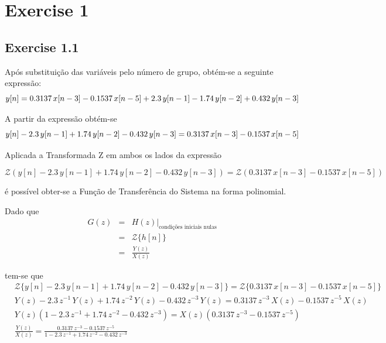 \documentclass[a4paper]{article}
\title{\documentTitle}
\author{\documentAuthors}
\begin{document}
\maketitle
\cleardoublepage

\tableofcontents
\cleardoublepage

\setlength{\parindent}{1cm}
\setlength{\parskip}{0.3cm}

\section{Exercise 1}
\subsection{Exercise 1.1}
\noindent Após substituição das variáveis pelo número de grupo, obtém-se a seguinte expressão:
\begin{equation}
	y[n] = 0.3137 \, x[n - 3] - 0.1537 \, x[n - 5] + 2.3 \, y[n - 1] - 1.74 \, y[n - 2] + 0.432 \, y[n - 3] \\
\end{equation}

\noindent A partir da expressão obtém-se
\begin{equation}
	y[n] - 2.3 \, y[n - 1] + 1.74 \, y[n - 2] - 0.432 \, y[n - 3] = 0.3137 \, x[n - 3] - 0.1537 \, x[n - 5] \\
\end{equation}

\noindent Aplicada a Transformada Z em ambos os lados da expressão

\begin{equation}
	\mathcal{Z}(y[n] - 2.3 \, y[n - 1] + 1.74 \, y[n - 2] - 0.432 \, y[n - 3]) = \mathcal{Z}(0.3137 \, x[n - 3] - 0.1537 \, x[n - 5])
\end{equation}

\noindent é possível obter-se a Função de Transferência do Sistema na forma polinomial.

\noindent Dado que
\begin{eqnarray}
	G(z) & = & H(z)|_{\text{condições iniciais nulas}} \\
		 & = & \mathcal{Z}\{h[n]\} \\
		 & = & \frac{Y(z)}{X(z)}
\end{eqnarray}

\noindent tem-se que
\begin{eqnarray}
	&\mathcal{Z}\{y[n] - 2.3 \, y[n - 1] + 1.74 \, y[n - 2] - 0.432 \, y[n - 3]\} = \mathcal{Z}\{0.3137 \, x[n - 3] - 0.1537 \, x[n - 5]\} \\
	&Y(z) - 2.3 \, z^{-1} \, Y(z) + 1.74 \, z^{-2} \, Y(z) - 0.432 \, z^{-3} \, Y(z) = 0.3137 \, z^{-3} \, X(z) - 0.1537 \, z^{-5} \, X(z) \\
	&Y(z) (1 - 2.3 \, z^{-1} + 1.74 \, z^{-2} - 0.432 \, z^{-3}) = X(z)(0.3137 \, z^{-3} - 0.1537 \, z^{-5}) \\
	&\frac{Y(z)}{X(z)} = \frac{0.3137 \, z^{-3} - 0.1537 \, z^{-5}}{1 - 2.3 \, z^{-1} + 1.74 \, z^{-2} - 0.432 \, z^{-3}}
\end{eqnarray}
\end{document}
